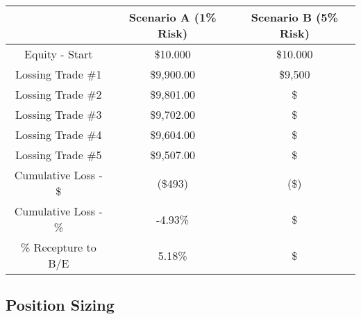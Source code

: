 \documentclass[10pt]{article}
\begin{document}
\renewcommand{\arraystretch}{1.5} %
\setlength{\tabcolsep}{10pt} %

\begin{adjustbox}{left}
\begin{tabular}{|c|c|c|}
\cline{2-3}
  \multicolumn{1}{c|}{} & Scenario A (1\% Risk) & Scenario B (5\% Risk) \\
\hline
Equity - Start & \$10.000 & \$10.000 \\
\hline
Lossing Trade \#1 & \$9,900.00 & \$9,500 \\
\hline                     
Lossing Trade \#2 & \$9,801.00 & \$ \\
\hline                     
Lossing Trade \#3 & \$9,702.00 & \$ \\
\hline                     
Lossing Trade \#4 & \$9,604.00 & \$ \\
\hline                     
Lossing Trade \#5 & \$9,507.00 & \$ \\
\hline
  Cumulative Loss - \$ & (\$493) & (\$) \\
\hline
Cumulative Loss - \% & -4.93\% & \$ \\
\hline
\% Recepture to B/E & 5.18\% & \$ \\
\hline

\end{tabular}

\end{adjustbox}

\newpage
\subsection{Position Sizing}

\end{document}

